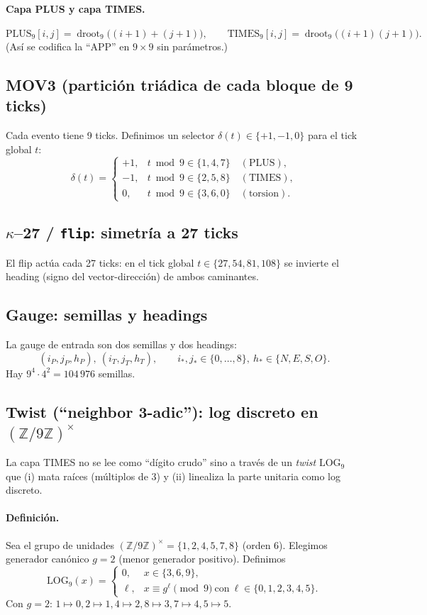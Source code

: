 \documentclass[11pt]{article}
\begin{document}
\paragraph{Capa PLUS y capa TIMES.}
\[
\mathrm{PLUS}_9[i,j]=\operatorname{droot}_9\big((i+1)+(j+1)\big),\qquad
\mathrm{TIMES}_9[i,j]=\operatorname{droot}_9\big((i+1)(j+1)\big).
\]
(As\'i se codifica la ``APP'' en $9\times 9$ sin par\'ametros.)

\subsection{MOV3 (partici\'on tri\'adica de cada bloque de 9 ticks)}
Cada evento tiene 9 ticks. Definimos un selector $\delta(t)\in\{+1,-1,0\}$ para el tick global $t$:
\[
\delta(t)=\begin{cases}
+1,& t\bmod 9\in\{1,4,7\} \quad(\text{PLUS}),\\
-1,& t\bmod 9\in\{2,5,8\} \quad(\text{TIMES}),\\
0,& t\bmod 9\in\{3,6,0\} \quad(\text{torsion}).
\end{cases}
\]

\subsection{$\kappa$--27 / \texttt{flip}: simetr\'ia a 27 ticks}
El flip act\'ua cada 27 ticks: en el tick global $t\in\{27,54,81,108\}$ se invierte el heading (signo del vector-direcci\'on) de ambos caminantes.

\subsection{Gauge: semillas y headings}
La gauge de entrada son dos semillas y dos headings:
\[
(i_P,j_P,h_P),\ (i_T,j_T,h_T), \qquad i_*,j_*\in\{0,\dots,8\},\ h_*\in\{N,E,S,O\}.
\]
Hay $9^4\cdot 4^2=104\,976$ semillas.

\subsection{Twist (``neighbor 3-adic''): log discreto en $(\mathbb Z/9\mathbb Z)^\times$}
La capa TIMES no se lee como ``d\'igito crudo'' sino a trav\'es de un \emph{twist} $\mathrm{LOG}_9$ que (i) mata ra\'ices (m\'ultiplos de 3) y (ii) linealiza la parte unitaria como log discreto.

\paragraph{Definici\'on.}
Sea el grupo de unidades $(\mathbb Z/9\mathbb Z)^\times=\{1,2,4,5,7,8\}$ (orden 6). Elegimos generador can\'onico $g=2$ (menor generador positivo). Definimos
\[
\mathrm{LOG}_9(x)=
\begin{cases}
0,& x\in\{3,6,9\},\\
\ell,& x\equiv g^\ell\pmod 9\ \text{con}\ \ell\in\{0,1,2,3,4,5\}.
\end{cases}
\]
Con $g=2$: $1\mapsto0,2\mapsto1,4\mapsto2,8\mapsto3,7\mapsto4,5\mapsto5$.
\end{document}
